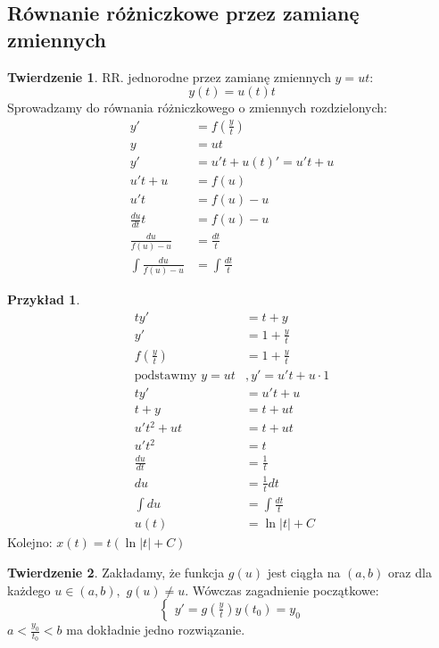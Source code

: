 \documentclass{article}
\theoremstyle{definition}
\theoremstyle{definition}
\newtheorem{tw}{Twierdzenie}[subsection]
\theoremstyle{definition}
\newtheorem{pk}{Przykład}[subsection]
\theoremstyle{definition}
\theoremstyle{definition}
\theoremstyle{definition}
\theoremstyle{definition}
\begin{document}
\subsection{Równanie różniczkowe przez zamianę zmiennych}

\begin{tw}
    RR. jednorodne przez zamianę zmiennych $y=ut$:
    \[y(t)=u(t)t\]
    Sprowadzamy do równania różniczkowego o zmiennych rozdzielonych:
    \begin{align}
        y'&=f\left(\frac{y}{t}\right)\\
        y&=ut\\
        y'&=u't+u(t)' =u't+u\\
        u't+u &= f(u)\\
        u't &= f(u)-u\\
        \frac{du}{dt}t &= f(u)-u\\
        \frac{du}{f(u)-u} &= \frac{dt}{t}\\
        \int \frac{du}{f(u)-u} &= \int \frac{dt}{t}
    \end{align}
\end{tw}

\begin{pk}
    \begin{align}
        ty' &= t + y\\
        y'&=1+\frac{y}{t}\\
        f(\frac{y}{t}) &= 1 + \frac{y}{t}\\
        \text {podstawmy } y=ut&, y'=u't + u \cdot 1\\
        ty' &= u't + u\\
        t+y &= t+ut\\
        u't^2 + ut &= t + ut\\
        u't^2 &= t\\
        \frac{du}{dt} &= \frac{1}{t}\\
        du &= \frac{1}{t} dt\\
        \int du &= \int \frac{dt}{t}\\
        u(t) &= \ln|t| + C
    \end{align}
    Kolejno: $x(t)=t\left(\ln|t|+C\right)$
\end{pk}

\begin{tw}
    Zakładamy, że funkcja $g(u)$ jest ciągła na $(a,b)$ 
    oraz dla każdego $u\in(a,b),$ $g(u)\neq u$.
    Wówczas zagadnienie początkowe:
    $$
    \begin{cases}
        y' = g\left(\frac{y}{t}\right)
        y(t_0)=y_0
    \end{cases}
    $$
    $a < \frac{y_0}{t_0} < b$ ma dokładnie jedno rozwiązanie.
\end{tw}
\end{document}
